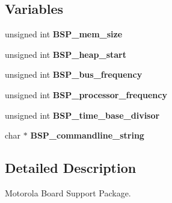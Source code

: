 \subsection*{Variables}
\begin{DoxyCompactItemize}
\item 
\mbox{\label{group__RTEMSBSPsPowerPCMotorola_ga8c4c5c7af3d465fe0600af1ce23505ba}} 
unsigned int {\bfseries B\+S\+P\+\_\+mem\+\_\+size}
\item 
\mbox{\label{group__RTEMSBSPsPowerPCMotorola_gae79fb5baa461166992f038271a9f9c86}} 
unsigned int {\bfseries B\+S\+P\+\_\+heap\+\_\+start}
\item 
\mbox{\label{group__RTEMSBSPsPowerPCMotorola_gacebd8212ca7912c89b531e7abaeb8389}} 
unsigned int {\bfseries B\+S\+P\+\_\+bus\+\_\+frequency}
\item 
\mbox{\label{group__RTEMSBSPsPowerPCMotorola_ga7a8f6379809948b0b0027d0a7b37755f}} 
unsigned int {\bfseries B\+S\+P\+\_\+processor\+\_\+frequency}
\item 
\mbox{\label{group__RTEMSBSPsPowerPCMotorola_ga98a2dadc74a0a129fcdb66f5e97e01c5}} 
unsigned int {\bfseries B\+S\+P\+\_\+time\+\_\+base\+\_\+divisor}
\item 
\mbox{\label{group__RTEMSBSPsPowerPCMotorola_ga100176343d992cefc1dda54c21c9abc3}} 
char $\ast$ {\bfseries B\+S\+P\+\_\+commandline\+\_\+string}
\end{DoxyCompactItemize}


\subsection{Detailed Description}
Motorola Board Support Package. 

